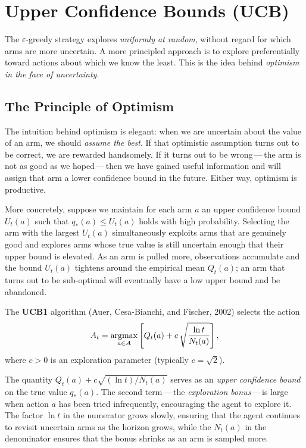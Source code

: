 \section{Upper Confidence Bounds (UCB)}
\label{sec:ucb}

The $\varepsilon$-greedy strategy explores \emph{uniformly at random}, without regard for which arms are more uncertain.  A more principled approach is to explore preferentially toward actions about which we know the least.  This is the idea behind \emph{optimism in the face of uncertainty}.

\subsection*{The Principle of Optimism}

The intuition behind optimism is elegant: when we are uncertain about the value of an arm, we should \emph{assume the best}.  If that optimistic assumption turns out to be correct, we are rewarded handsomely.  If it turns out to be wrong\,---\,the arm is not as good as we hoped\,---\,then we have gained useful information and will assign that arm a lower confidence bound in the future.  Either way, optimism is productive.

More concretely, suppose we maintain for each arm $a$ an upper confidence bound $U_t(a)$ such that $q_*(a) \le U_t(a)$ holds with high probability.  Selecting the arm with the largest $U_t(a)$ simultaneously exploits arms that are genuinely good and explores arms whose true value is still uncertain enough that their upper bound is elevated.  As an arm is pulled more, observations accumulate and the bound $U_t(a)$ tightens around the empirical mean $Q_t(a)$; an arm that turns out to be sub-optimal will eventually have a low upper bound and be abandoned.

\begin{definition}[UCB1]
\label{def:ucb1}
The \textbf{UCB1} algorithm (Auer, Cesa-Bianchi, and Fischer, 2002) selects the action
\begin{equation}
\label{eq:ucb1}
A_t = \operatorname*{argmax}_{a\in\mathcal{A}}\left[Q_t(a) + c\,\sqrt{\frac{\ln t}{N_t(a)}}\right],
\end{equation}
where $c>0$ is an exploration parameter (typically $c=\sqrt{2}$).
\end{definition}

The quantity $Q_t(a)+c\sqrt{(\ln t)/N_t(a)}$ serves as an \emph{upper confidence bound} on the true value $q_*(a)$.  The second term\,---\,the \emph{exploration bonus}\,---\,is large when action $a$ has been tried infrequently, encouraging the agent to explore it.  The factor $\ln t$ in the numerator grows slowly, ensuring that the agent continues to revisit uncertain arms as the horizon grows, while the $N_t(a)$ in the denominator ensures that the bonus shrinks as an arm is sampled more.

